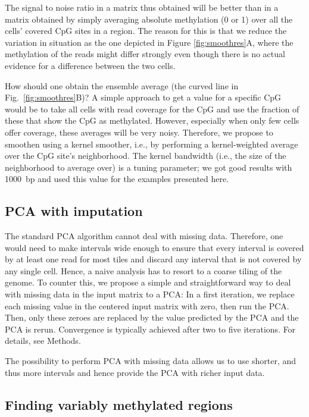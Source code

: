 \documentclass[twocolumn,10pt]{article}
\begin{document}
The signal to noise ratio in a matrix thus obtained will be better than in a matrix obtained by simply averaging absolute methylation (0 or 1) over all the cells' covered CpG sites in a region. The reason for this is that we reduce the variation in situation as the one depicted in Figure \ref{fig:smoothres}A, where the methylation of the reads might differ strongly even though there is no actual evidence for a difference between the two cells.

How should one obtain the ensemble average (the curved line in Fig.\ \ref{fig:smoothres}B)? A simple approach to get a value for a specific CpG would be to take all cells with read coverage for the CpG and use the fraction of these that show the CpG as methylated. However, especially when only few cells offer coverage, these averages will be very noisy. Therefore, we propose to smoothen using a kernel smoother, i.e., by performing a kernel-weighted average over the CpG site's neighborhood. The kernel bandwidth (i.e., the size of the neighborhood to average over) is a tuning parameter; we got good results with 1000~bp and used this value for the examples presented here.

\subsection{PCA with imputation}

The standard PCA algorithm cannot deal with missing data. Therefore, one would need to make intervals wide enough to ensure that every interval is covered by at least one read for most tiles and discard any interval that is not covered by any single cell. Hence, a naive analysis has to resort to a coarse tiling of the genome. To counter this, we propose a simple and straightforward way to deal with missing data in the input matrix to a PCA: In a first iteration, we replace each missing value in the centered input matrix with zero, then run the PCA. Then, only these zeroes are replaced by the value predicted by the PCA and the PCA is rerun. Convergence is typically achieved after two to five iterations. For details, see Methods. 

The possibility to perform PCA with missing data allows us to use shorter, and thus more intervals and hence provide the PCA with richer input data.

\subsection{Finding variably methylated regions}
\end{document}
